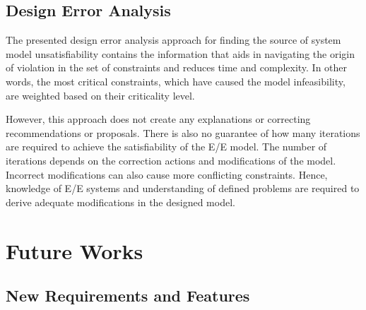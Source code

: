     
    \subsection{Design Error Analysis}
    
    The presented design error analysis approach for finding the source of system model unsatisfiability contains the information that aids in navigating the origin of violation in the set of constraints and reduces time and complexity. In other words, the most critical constraints, which have caused the model infeasibility, are weighted based on their criticality level.
    
    However, this approach does not create any explanations or correcting recommendations or proposals.
    There is also no guarantee of how many iterations are required to achieve the satisfiability
    of the E/E model. The number of iterations depends on the correction actions and
    modifications of the model. Incorrect modifications can also cause more conflicting constraints. Hence, knowledge of E/E systems and understanding of defined problems are required to derive
    adequate modifications in the designed model. 
    
    
    
    \section{Future Works}
    
    
    \subsection{New Requirements and Features}
    
    
    
